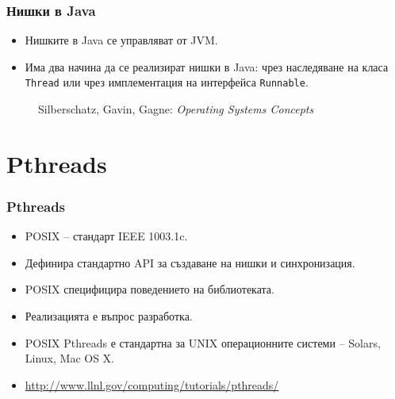 \documentclass[ignorenonframetext, hyperref=unicode]{beamer}
\begin{document}
\begin{frame}\frametitle{Нишки в Java}
\begin{itemize}
\item Нишките в Java се управляват от JVM.
\item Има два начина да се реализират нишки в Java:
чрез наследяване на класа \lstinline{Thread} или чрез имплементация на
интерфейса \lstinline{Runnable}.
\end{itemize}
\begin{figure}[h]
\center
{}
\caption{Silberschatz, Gavin, Gagne: {\em Operating Systems Concepts}}
\end{figure}
\end{frame}

\section{Pthreads}

\begin{frame}\frametitle{Pthreads}
\begin{itemize}
\item POSIX -- стандарт IEEE 1003.1c.
\item Дефинира стандартно API за създаване на нишки и синхронизация.
\item POSIX специфицира поведението на библиотеката.
\item Реализацията е въпрос разработка.
\item POSIX Pthreads е стандартна за UNIX операционните системи -- Solars,
Linux, Mac OS X.
\item \url{http://www.llnl.gov/computing/tutorials/pthreads/}
\end{itemize}
\end{frame}
\end{document}

